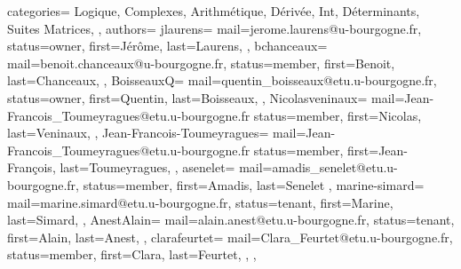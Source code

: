 {
  categories={
    Logique,
    Complexes,
    Arithmétique,
    Dérivée,
    Int,
    Déterminants,
    Suites
    Matrices,
  },
  authors={
    jlaurens={
      mail=jerome.laurens@u-bourgogne.fr,
      status=owner,
      first=Jérôme,
      last=Laurens,
    },
    bchanceaux={
      mail=benoit.chanceaux@u-bourgogne.fr,
      status=member,
      first=Benoit,
      last=Chanceaux,
    },
    BoisseauxQ={
      mail=quentin_boisseaux@etu.u-bourgogne.fr,
      status=owner,
      first=Quentin,
      last=Boisseaux,
    },
    Nicolasveninaux={
      mail=Jean-Francois_Toumeyragues@etu.u-bourgogne.fr
      status=member,
      first=Nicolas,
      last=Veninaux,
    },
    Jean-Francois-Toumeyragues={
      mail=Jean-Francois_Toumeyragues@etu.u-bourgogne.fr
      status=member,
      first=Jean-François,
      last=Toumeyragues,
    },
    asenelet={
      mail=amadis_senelet@etu.u-bourgogne.fr, 
      status=member,
      first=Amadis,
      last=Senelet
    },
    marine-simard={
      mail=marine.simard@etu.u-bourgogne.fr,
      status=tenant,
      first=Marine,
      last=Simard,
    },  
    AnestAlain={
      mail=alain.anest@etu.u-bourgogne.fr,
      status=tenant,
      first=Alain,
      last=Anest,
    },
    clarafeurtet={
       mail=Clara_Feurtet@etu.u-bourgogne.fr,
       status=member,
       first=Clara,
       last=Feurtet,
     },
  },
}
